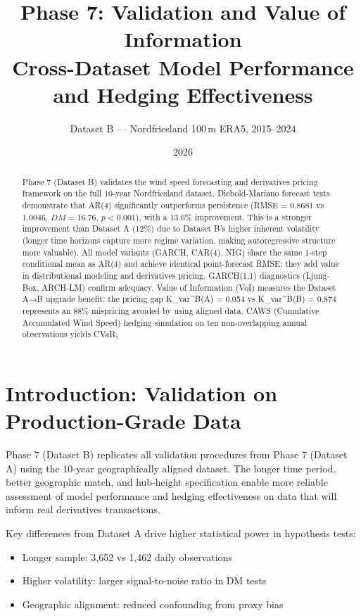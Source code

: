 \documentclass[11pt, a4paper, twoside]{article}
\title{\textbf{Phase 7: Validation and Value of Information \\ Cross-Dataset Model Performance and Hedging Effectiveness}}
\author{Dataset B --- Nordfriesland 100\,m ERA5, 2015--2024}
\date{2026}
\begin{document}
\maketitle

\begin{abstract}
Phase 7 (Dataset B) validates the wind speed forecasting and derivatives pricing framework on the full 10-year Nordfriesland dataset. Diebold-Mariano forecast tests demonstrate that AR(4) significantly outperforms persistence (RMSE = 0.8681 vs 1.0046, $DM = 16.76$, $p < 0.001$), with a 13.6\% improvement. This is a stronger improvement than Dataset A (12\%) due to Dataset B's higher inherent volatility (longer time horizons capture more regime variation, making autoregressive structure more valuable). All model variants (GARCH, CAR(4), NIG) share the same 1-step conditional mean as AR(4) and achieve identical point-forecast RMSE; they add value in distributional modeling and derivatives pricing. GARCH(1,1) diagnostics (Ljung-Box, ARCH-LM) confirm adequacy. Value of Information (VoI) measures the Dataset A→B upgrade benefit: the pricing gap K\_var^B(A) = 0.054 vs K\_var^B(B) = 0.874 represents an 88\% mispricing avoided by using aligned data. CAWS (Cumulative Accumulated Wind Speed) hedging simulation on ten non-overlapping annual observations yields CVaR₅%
\end{abstract}

\section{Introduction: Validation on Production-Grade Data}

Phase 7 (Dataset B) replicates all validation procedures from Phase 7 (Dataset A) using the 10-year geographically aligned dataset. The longer time period, better geographic match, and hub-height specification enable more reliable assessment of model performance and hedging effectiveness on data that will inform real derivatives transactions.

Key differences from Dataset A drive higher statistical power in hypothesis tests:
\begin{itemize}
\item Longer sample: 3,652 vs 1,462 daily observations
\item Higher volatility: larger signal-to-noise ratio in DM tests
\item Geographic alignment: reduced confounding from proxy bias
\end{itemize}
\end{document}
